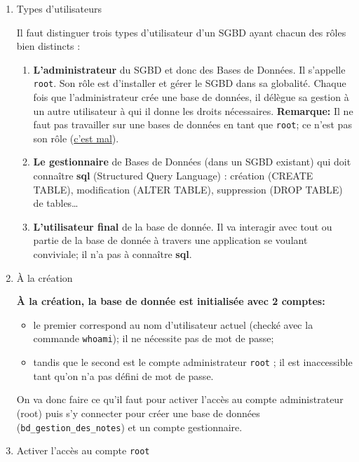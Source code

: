 \documentclass[11pt]{article}
\begin{document}
\begin{enumerate}
\item Types d'utilisateurs
\label{sec:orgc456a68}

Il faut distinguer trois types d'utilisateur d'un SGBD ayant chacun des rôles bien distincts :
\begin{enumerate}
\item \textbf{L'administrateur} du SGBD et donc des Bases de Données. Il s'appelle \texttt{root}. Son rôle est d'installer et gérer le SGBD dans sa globalité. Chaque fois que l'administrateur crée une base de données, il délègue sa gestion à un autre utilisateur à qui il donne les droits nécessaires. \textbf{Remarque:}  Il ne faut pas travailler sur une bases de données en tant que \texttt{root}; ce n'est pas son rôle (\href{https://www.youtube.com/watch?v=oiQG6tP3940}{c'est mal}).
\item \textbf{Le gestionnaire} de Bases de Données (dans un SGBD existant) qui doit connaître  \textbf{sql} (Structured Query Language) : création (CREATE TABLE), modification (ALTER TABLE), suppression (DROP TABLE) de tables\ldots{}
\item \textbf{L'utilisateur final} de la base de donnée. Il va interagir avec tout ou partie de la base de donnée à travers une application se voulant conviviale; il n'a pas à connaître \textbf{sql}.
\end{enumerate}



\item À la création
\label{sec:org84e5f19}

\textbf{À la création, la base de donnée est initialisée avec 2 comptes:} 
\begin{itemize}
\item le premier correspond au nom d'utilisateur actuel (checké avec la commande \texttt{whoami}); il ne nécessite pas de mot de passe;
\item tandis que le second est le compte administrateur \texttt{root} ; il est inaccessible tant qu'on n'a pas défini de mot de passe.
\end{itemize}

On va donc faire ce qu'il faut pour activer l'accès au compte administrateur (root) puis s'y connecter pour créer une base de données (\texttt{bd\_gestion\_des\_notes}) et un compte gestionnaire.  

\item Activer l'accès au compte \texttt{root}
\label{sec:org758eaa0}


\end{enumerate}
\end{document}
